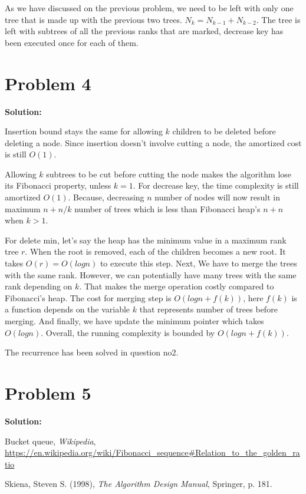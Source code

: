 \documentclass{article}
\begin{document}
As we have discussed on the previous problem, we need to be left with only one tree that is made up with the previous two trees.
$N_k=N_{k-1}+N_{k-2}$. The tree is left with subtrees of all the previous ranks that are marked, decrease key has been executed
once for each of them.

\section*{Problem 4}
\textbf{Solution:}

Insertion bound stays the same for allowing $k$ children to be deleted before deleting a node.
Since insertion doesn't involve cutting a node, the amortized cost is still $O(1)$.

Allowing $k$ subtrees to be cut before cutting the node makes the algorithm lose its Fibonacci property, unless $k=1$.
For decrease key, the time complexity is still amortized $O(1)$. Because, decreasing $n$ number of nodes will now result in maximum $n+n/k$
number of trees which is less than Fibonacci heap's $n+n$ when $k>1$.

For delete min, let's say the heap has the minimum value in a maximum rank tree $r$. When the root is removed, each of the children becomes a new root.
It takes $O(r)=O(logn)$ to execute this step. Next, We have to merge the trees with the same rank.
However, we can potentially have many trees with the same rank depending on $k$. That makes the merge operation costly compared to Fibonacci's heap.
The cost for merging step is $O(logn+f(k))$, here $f(k)$ is a function depends on the variable $k$ that represents number of trees before merging.
And finally, we have update the minimum pointer which takes $O(logn)$. Overall, the running complexity is bounded by $O(logn+f(k))$.

The recurrence has been solved in question no2.

\section*{Problem 5}
\textbf{Solution:}

\begin{thebibliography}{9}

Bucket queue, \emph{Wikipedia}, \url{https://en.wikipedia.org/wiki/Fibonacci_sequence#Relation_to_the_golden_ratio}

Skiena, Steven S. (1998), \emph{The Algorithm Design Manual}, Springer, p. 181.

\end{thebibliography}
\end{document}
